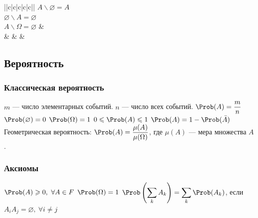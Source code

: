 \begin{tabu}{||c|c|c|c|c||}
{		$\displaystyle A\backslash\varnothing = A $\\
		$\displaystyle \varnothing\backslash A = \varnothing $\\
		$\displaystyle A\backslash\Omega = \varnothing $} &
		 \\
	\hline
		 &
		 &
		 &
		 \\
	\hline
\end{tabu}
\subsection{Вероятность}
\subsubsection{Классическая вероятность}
$m$ --- число элементарных событий.
$n$ --- число всех событий.
$\displaystyle \Prob(A) = \frac{m}{n} $
$\displaystyle \Prob(\varnothing) = 0 $
$\displaystyle \Prob(\Omega) = 1 $
$\displaystyle 0 \leqslant \Prob(A) \leqslant 1 $
$\displaystyle \Prob(A) = 1 - \Prob(\bar{A}) $
Геометрическая вероятность:
$\displaystyle \Prob(A) = \frac{\mu(A)}{\mu(\Omega)} $, где $\mu(A)$ --- мера множества $A$.
\subsubsection{Аксиомы}
$\displaystyle \Prob(A) \geqslant 0,\ \forall A \in F $
$\displaystyle \Prob(\Omega) = 1 $
$\displaystyle \Prob\left(\sum_k A_k\right) = \sum_k \Prob(A_k) $, если $\displaystyle A_i A_j = \varnothing,\ \forall i \neq j $
